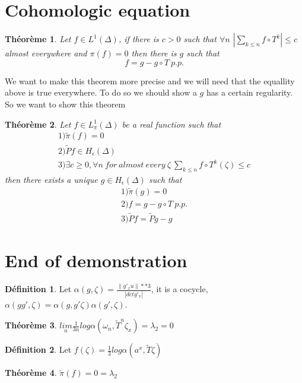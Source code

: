\documentclass[12pt]{article}
\theoremstyle{plain}%
\newtheorem{thm}{Théorème}[section]
\theoremstyle{definition}
\newtheorem{dfnt}{Définition}[section]
\theoremstyle{remark}
\begin{document}
\section{Cohomologic equation}
\begin{thm}
Let $f \in L^1(\Delta)$, if there is $c>0$ such that $\forall n$ $|\sum_{k \leq n}f \circ T^k|\leq c$ almost everywhere and $\pi(f)=0$ then there is $g$ such that \[
f=g-g \circ T \ p.p.
\]
\end{thm}
We want to make this theorem more precise and we will need that the equallity above is true everywhere. To do so we should show a $g$ has a certain regularity. So we want to show this theorem
\begin{thm}
Let $f \in L^1_\pi(\Delta)$ be a real function such that \[
\begin{matrix}
1)\tilde{\pi}(f)=0 \\
2)\tilde{P}f \in H_\epsilon(\Delta)\\
3)\exists c \geq 0,\forall n \ for\ almost\ every\ \zeta \ \sum_{k \leq n}f \circ T^k(\zeta)\leq c
\end{matrix}
\]then there exists a unique $g \in H_\epsilon(\Delta)$ such that\[\begin{matrix}
1)\tilde{\pi}(g)=0 \\
2)f=g-g\circ T \ p.p. \\
3)\tilde{P}f=\tilde{P}g-g
\end{matrix}
\]
\end{thm}
\section{End of demonstration}

\begin{dfnt}
Let $\alpha (g,\zeta)=\frac{\| g'_x u\|**3}{|det g'_x|}$, it is a cocycle, $\alpha(g g', \zeta)=\alpha(g,g' \zeta) \alpha(g',\zeta)$.
\end{dfnt}

\begin{thm}
$\underset{n}{lim} \frac{1}{3n} log \alpha(\omega_n,\tilde{T}^n \zeta_x)=\lambda_2=0$
\end{thm}

\begin{dfnt}
Let $f(\zeta)=\frac{1}{3} log \alpha (a^x, \tilde{T} \zeta)$
\end{dfnt}

\begin{thm}
$\tilde{\pi}(f)=0=\lambda_2$
\end{thm}
\end{document}
